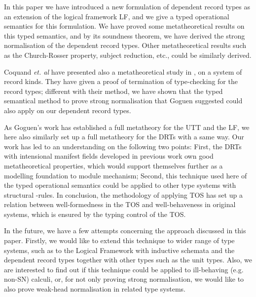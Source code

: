 \documentclass[submission,copyright,creativecommons]{eptcs}
\begin{document}
{\par{In this paper we have introduced a new formulation of dependent record types as an extension of the logical framework LF, and we give a typed operational semantics for this formulation. We have proved some metatheoretical results on this typed semantics, and by its soundness theorem, we have derived the strong normalisation of the dependent record types. Other metatheoretical results such as the Church-Rosser property, subject reduction, etc., could be similarly derived. }

\par{Coquand \emph{et. al} have presented also a metatheoretical study in \cite{ctp:semantic-records05}, on a system of record kinds. They have given a proof of termination of type-checking for the record types; different with their method, we have shown that the typed semantical method to prove strong normalisation that Goguen suggested could also apply on our dependent record types. }

\par{As Goguen's work has established a full metatheory for the UTT and the LF, we here also similarly set up a full metatheory for the DRTs with a same way. Our work has led to an understanding on the following two points: First, the DRTs with intensional manifest fields developed in previous work \cite{luo:TYPES08,luo:MLPA09} own good metatheoretical properties, which would support themselves further as a modelling foundation to module mechanism; Second, this technique used here of the typed operational semantics could be applied to other type systems with structural -rules. In conclusion, the methodology of applying TOS has set up a relation between well-formedness in the TOS and well-behaveness in original systems, which is ensured by the typing control of the TOS. }

\par{In the future, we have a few attempts concerning the approach discussed in this paper. Firstly, we would like to extend this technique to wider range of type systems, such as to the Logical Framework with inductive schemata and the dependent record types together with other types such as the unit types.
Also, we are interested to find out if this technique could be applied
to ill-behaving (e.g. non-SN) calculi, or, for not only proving strong normalisation, we would like to also prove weak-head normalisation in related type systems. }





}
\end{document}
